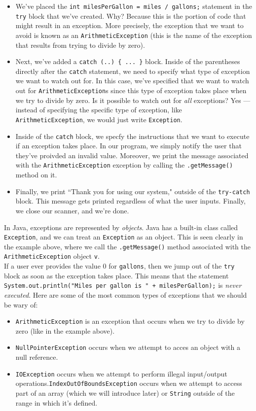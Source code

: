 \begin{itemize}
    \item We've placed the \verb!int milesPerGallon = miles / gallons;! statement in the \verb!try! block that we've created. Why? Because this is the portion of code that might result in an exception. More precisely, the exception that we want to avoid is known as an \verb!ArithmeticException! (this is the name of the exception that results from trying to divide by zero).
    \item Next, we've added a \verb!catch (..) { ... }! block. Inside of the parentheses directly after the \verb!catch! statement, we need to specify what type of exception we want to watch out for. In this case, we've specified that we want to watch out for \verb!ArithmeticException!s since this type of exception takes place when we try to divide by zero. Is it possible to watch out for \textit{all} exceptions? Yes --- instead of specifying the specific type of exception, like \verb!ArithmeticException!, we would just write \verb!Exception!. 
    \item Inside of the \verb!catch! block, we specfy the instructions that we want to execute if an exception takes place. In our program, we simply notify the user that they've proivded an invalid value. Moreover, we print the message associated with the \verb!ArithmeticException! exception by calling the \verb!.getMessage()! method on it. 
    \item Finally, we print ``Thank you for using our system," outside of the \verb!try-catch! block. This message gets printed regardless of what the user inputs. Finally, we close our scanner, and we're done. 
\end{itemize}

In Java, exceptions are represented by \textit{objects}. Java has a built-in class called \verb!Exception!, and we can treat an \verb!Exception! as an object. This is seen clearly in the example above, where we call the \verb!.getMessage()! method associated with the \verb!ArithmeticException! object \verb!v!.  \\

If a user ever provides the value $0$ for \verb!gallons!, then we jump out of the \verb!try! block as soon as the exception takes place. This means that the statement \verb!System.out.println("Miles per gallon is " + milesPerGallon);! is \textit{never executed}. 
Here are some of the most common types of exceptions that we should be wary of:

\begin{itemize}
    \item \verb!ArithmeticException! is an exception that occurs when we try to divide by zero (like in the example above).
    \item \verb!NullPointerException! occurs when we attempt to acces an object with a null reference.
    \item \verb!IOException! occurs when we attempt to perform illegal input/output operations.\verb!IndexOutOfBoundsException! occurs when we attempt to access part of an array (which we will introduce later) or \verb!String! outside of the range in which it's defined.
\end{itemize}


